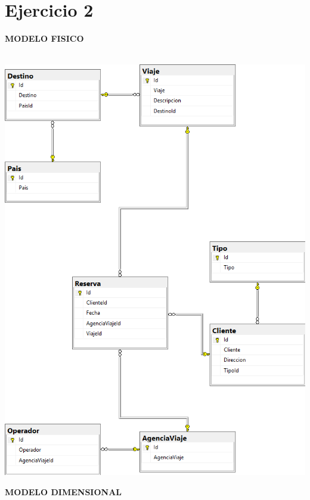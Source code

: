 \documentclass[12pt,letterpaper]{article}
\begin{document}
\newpage
\section{Ejercicio 2}
\textbf{MODELO FISICO}\\\\
\begin{center} 
\includegraphics[width=14cm]{imagenes/e2.png}\\
\end{center} 
\newpage
\textbf{MODELO DIMENSIONAL}\\\\
\end{document}
